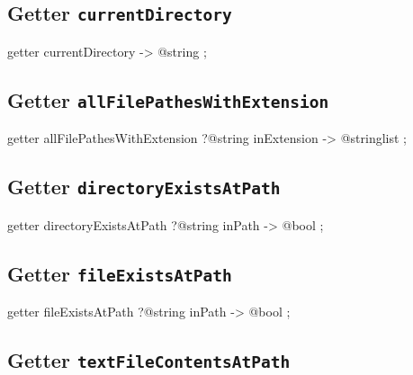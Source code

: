 \subsection{Getter \texttt{currentDirectory}}

\begin{galgas4}
getter currentDirectory -> @string ;
\end{galgas4}








\subsection{Getter \texttt{allFilePathesWithExtension}}

\begin{galgas4}
getter allFilePathesWithExtension ?@string inExtension -> @stringlist ;
\end{galgas4}










\subsection{Getter \texttt{directoryExistsAtPath}}

\begin{galgas4}
getter directoryExistsAtPath ?@string inPath -> @bool ;
\end{galgas4}










\subsection{Getter \texttt{fileExistsAtPath}}

\begin{galgas4}
getter fileExistsAtPath ?@string inPath -> @bool ;
\end{galgas4}










\subsection{Getter \texttt{textFileContentsAtPath}}

